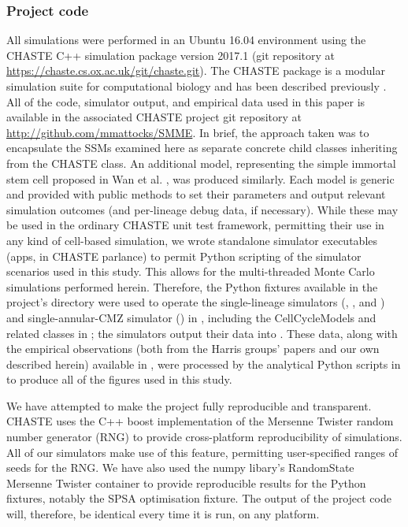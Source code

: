 \subsubsection{Project code}
All simulations were performed in an Ubuntu 16.04 environment using the CHASTE C++ simulation package version 2017.1 (git repository at \url{https://chaste.cs.ox.ac.uk/git/chaste.git}). The CHASTE package is a modular simulation suite for computational biology and has been described previously \cite{Mirams2013}. All of the code, simulator output, and empirical data used in this paper is available in the associated CHASTE project git repository at \url{http://github.com/mmattocks/SMME}. In brief, the approach taken was to encapsulate the SSMs examined here as separate concrete child classes inheriting from the CHASTE  class. An additional model, representing the simple immortal stem cell proposed in Wan et al. \cite{Wan2016}, was produced similarly. Each model is generic and provided with public methods to set their parameters and output relevant simulation outcomes (and per-lineage debug data, if necessary). While these may be used in the ordinary CHASTE unit test framework, permitting their use in any kind of cell-based simulation, we wrote standalone simulator executables (apps, in CHASTE parlance) to permit Python scripting of the simulator scenarios used in this study. This allows for the multi-threaded Monte Carlo simulations performed herein. Therefore, the Python fixtures available in the project's  directory were used to operate the single-lineage simulators (, , and ) and single-annular-CMZ simulator () in , including the CellCycleModels and related classes in ; the simulators output their data into . These data, along with the empirical observations (both from the Harris groups' papers and our own described herein) available in , were processed by the analytical Python scripts in  to produce all of the figures used in this study.

We have attempted to make the project fully reproducible and transparent. CHASTE uses the C++ boost implementation of the Mersenne Twister random number generator (RNG) to provide cross-platform reproducibility of simulations. All of our simulators make use of this feature, permitting user-specified ranges of seeds for the RNG. We have also used the numpy libary's RandomState Mersenne Twister container to provide reproducible results for the Python fixtures, notably the SPSA optimisation fixture. The output of the project code will, therefore, be identical every time it is run, on any platform.

